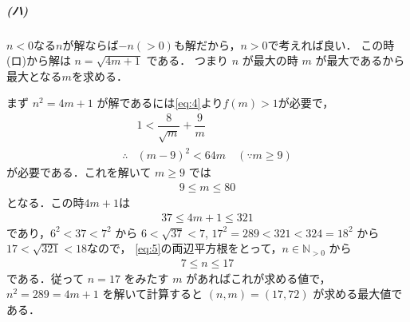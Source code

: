 \documentclass[../../main.tex]{subfiles}
\begin{document}
\subparagraph{(ハ)}

$n<0$なる$n$が解ならば$-n(>0)$も解だから，$n>0$で考えれば良い．
この時(ロ)から解は $n = \sqrt{4m+1}$ である．
つまり $n$ が最大の時 $m$ が最大であるから最大となる$m$を求める．

まず $n^2 = 4m+1$ が解であるには\cref{eq:4}より$f(m)>1$が必要で，
\begin{align}
  & 1 < \dfrac{8}{\sqrt{m}} + \dfrac{9}{m} \\
  \therefore
  & (m-9)^2 < 64m \quad (\because m \ge 9)
\end{align}
が必要である．これを解いて $m\ge 9$ では
\begin{align}
  9 \le m \le 80
\end{align}
となる．この時$4m+1$は
\begin{align}
  37 \le 4m+1 \le 321 \label{eq:5}
\end{align}
であり，$6^2 < 37 < 7^2$ から $6 < \sqrt{37} < 7$,
$17^2=289 < 321 < 324=18^2$ から $17 < \sqrt{321} < 18$なので，
\cref{eq:5}の両辺平方根をとって，$n \in \mathbb{N}_{>0}$ から
\begin{align}
  7 \le n \le 17
\end{align}
である．従って $n=17$ をみたす $m$ があればこれが求める値で，
$n^2 = 289 = 4m+1$ を解いて計算すると $(n, m) = (17, 72)$ が求める最大値である．
\end{document}

